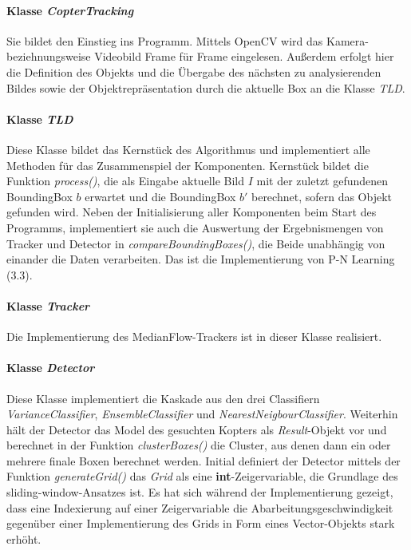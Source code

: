 \paragraph{Klasse \textit{CopterTracking}}
Sie bildet den Einstieg ins Programm. Mittels OpenCV wird das Kamera- beziehnungsweise Videobild Frame für Frame eingelesen. Außerdem erfolgt hier die Definition des Objekts und die Übergabe des nächsten zu analysierenden Bildes sowie der Objektrepräsentation durch die aktuelle Box an die Klasse \textit{TLD}.

\paragraph{Klasse \textit{TLD}}
Diese Klasse bildet das Kernstück des Algorithmus und implementiert alle Methoden für das Zusammenspiel der Komponenten. Kernstück bildet die Funktion \textit{process()}, die als Eingabe aktuelle Bild $I$ mit der zuletzt gefundenen BoundingBox $b$ erwartet und die BoundingBox $b'$ berechnet, sofern das Objekt gefunden wird. Neben der Initialisierung aller Komponenten beim Start des Programms, implementiert sie auch die Auswertung der Ergebnismengen von Tracker und Detector in \textit{compareBoundingBoxes()}, die Beide unabhängig von einander die Daten verarbeiten. Das ist die Implementierung von P-N Learning (3.3).

\paragraph{Klasse \textit{Tracker}}
Die Implementierung des MedianFlow-Trackers ist in dieser Klasse realisiert.

\paragraph{Klasse \textit{Detector}}
Diese Klasse implementiert die Kaskade aus den drei Classifiern \textit{VarianceClassifier}, \textit{EnsembleClassifier} und \textit{NearestNeigbourClassifier}. Weiterhin hält der Detector das Model des gesuchten Kopters als \textit{Result}-Objekt vor und berechnet in der Funktion \textit{clusterBoxes()} die Cluster, aus denen dann ein oder mehrere finale Boxen berechnet werden. Initial definiert der Detector mittels der Funktion \textit{generateGrid()} das \textit{Grid} als eine \textbf{int}-Zeigervariable, die Grundlage des sliding-window-Ansatzes ist. Es hat sich während der Implementierung gezeigt, dass eine Indexierung auf einer Zeigervariable die Abarbeitungsgeschwindigkeit gegenüber einer Implementierung des Grids in Form eines Vector-Objekts stark erhöht.

